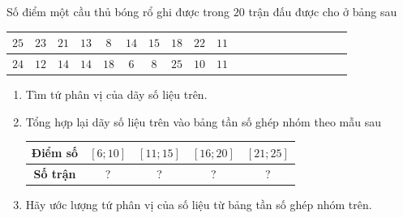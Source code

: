 \begin{bt}[Mức độ 2]%
	Số điểm một cầu thủ bóng rổ ghi được trong $ 20 $ trận đấu được cho ở bảng sau
	\begin{center}
		\begin{tabular}{|c|c|c|c|c|c|c|c|c|c|c|c|c|c|c|c|c|c|c|c|}
			\hline 
			$ 25 $	& $ 23 $ & $ 21 $ & $ 13 $ & $ 8 $ & $ 14 $ & $ 15 $ & $ 18 $ & $ 22 $ & $ 11 $\\ 
			\hline 
			$ 24 $	& $ 12 $ & $ 14 $ & $ 14 $ & $ 18 $ & $ 6 $ & $ 8 $ & $ 25 $ & $ 10 $ & $ 11 $ \\ 
			\hline 
		\end{tabular} 
	\end{center}
	\begin{enumerate}
		\item Tìm tứ phân vị của dãy số liệu trên.
		\item Tổng hợp lại dãy số liệu trên vào bảng tần số ghép nhóm theo mẫu sau
		\begin{center}
			\begin{tabular}{|c|c|c|c|c|}
				\hline 
				\textbf{Điểm số}	& $\left[ 6;10\right] $ & $\left[ 11;15\right] $ & $\left[16;20\right] $ & $\left[ 21;25\right] $\\ 
				\hline 
				\textbf{Số trận}	& ? & ? & ? & ?\\ 
				\hline 
			\end{tabular} 
		\end{center}
		\item Hãy ước lượng tứ phân vị của số liệu từ bảng tần số ghép nhóm trên.
	\end{enumerate}
\end{bt}
